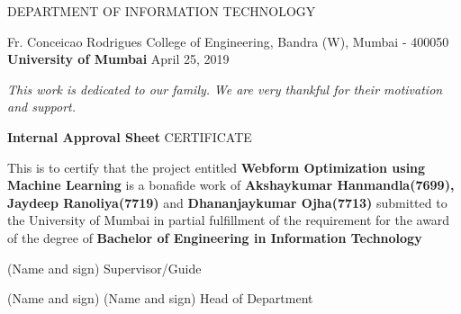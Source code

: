 \documentclass[12pt]{report}
\begin{document}
\hspace*{90px} DEPARTMENT OF INFORMATION TECHNOLOGY
\newline
\begin{center}
 Fr. Conceicao Rodrigues College of Engineering, Bandra (W), Mumbai - 400050
\newline
\newline
\hspace*{60px} \textbf{ University of Mumbai}
\newline
April 25, 2019
\end{center}
\newpage
\vspace*{230px}
\begin{center}
\hspace*{50px}
\textit{This work is dedicated to our family.}
\newline
\textit{We are very thankful for their motivation and support.}
\end{center}
\newpage
\begin{center}
\begin{Huge}
\hspace*{23px}
\textbf{ Internal Approval Sheet }
\newline
\newline
\newline
\vspace*{23px}
CERTIFICATE
\end{Huge}
\end{center}
\vspace*{80px}
This is to certify that the project entitled \textbf{Webform Optimization using Machine
Learning} is a bonafide work of \textbf{Akshaykumar Hanmandla(7699), Jaydeep Ranoliya(7719)}
and \textbf{Dhananjaykumar Ojha(7713)} submitted to the University of Mumbai in partial fulfillment of
the requirement for the award of the degree of\textbf{ Bachelor of Engineering in Information Technology}
\vspace*{60px}
\begin{center}
\hspace*{80px}
(Name and sign)
\newline
Supervisor/Guide
\end{center}
\vspace*{100px}
\hspace*{30px}
(Name and sign)
\hspace*{230px}
(Name and sign)
\vspace*{5px}
\hspace*{30px}
Head of Department
\hspace*{230px}
\end{document}
